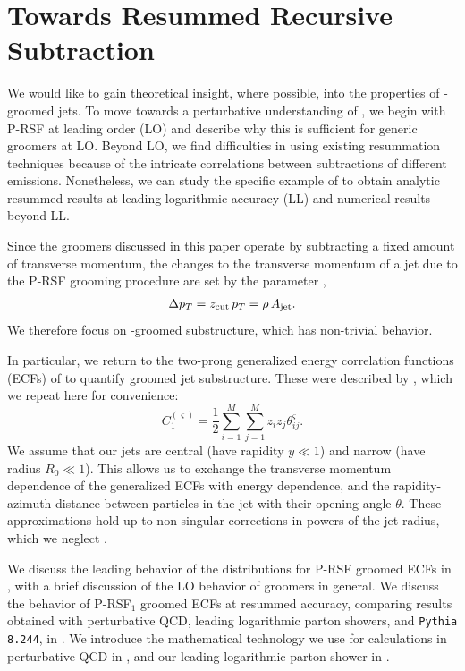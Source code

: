 \section{Towards Resummed Recursive Subtraction}
\label{app:calc}
We would like to gain theoretical insight, where possible, into the properties of \PIRANHA{}-groomed jets.
%
To move towards a perturbative understanding of \PIRANHA{}, we begin with P-RSF at leading order (LO) and describe why this is sufficient for generic \PIRANHA{} groomers at LO.
%
Beyond LO, we find difficulties in using existing resummation techniques because of the intricate correlations between subtractions of different emissions.
%
Nonetheless, we can study the specific example of  to obtain analytic resummed results at leading logarithmic accuracy (LL) and numerical results beyond LL.

Since the \PIRANHA{} groomers discussed in this paper operate by subtracting a fixed amount of transverse momentum, the changes to the transverse momentum of a jet due to the P-RSF grooming procedure are set by the parameter \zcut{},
\begin{align}
    \Delta p_T = z_{\rm cut}\,p_T = \rho\,A_{\rm jet}
    .
\end{align}
%
We therefore focus on \PIRANHA{}-groomed substructure, which has non-trivial behavior.

In particular, we return to the two-prong generalized energy correlation functions (ECFs) of  to quantify groomed jet substructure.
%
These were described by , which we repeat here for convenience:
\begin{equation}
    C_1^{(\varsigma)} = \frac{1}{2}\sum_{i=1}^M\sum_{j=1}^M z_i z_j \theta_{ij}^\varsigma
    \label{eqn:ECFdefn_repeat}
    .
\end{equation}
We assume that our jets are central (have rapidity \(y \ll 1\)) and narrow (have radius \(R_0 \ll 1\)).
%
This allows us to exchange the transverse momentum dependence of the generalized ECFs with energy dependence, and the rapidity-azimuth distance between particles in the jet with their opening angle \(\theta\).
%
These approximations hold up to non-singular corrections in powers of the jet radius, which we neglect \cite{Larkoski:2014wba}.

We discuss the leading behavior of the distributions for P-RSF groomed ECFs in , with a brief discussion of the LO behavior of \PIRANHA{} groomers in general.
%
We discuss the behavior of P-RSF\(_{1}\) groomed ECFs at resummed accuracy, comparing results obtained with perturbative QCD, leading logarithmic parton showers, and \texttt{Pythia 8.244}, in .
%
We introduce the mathematical technology we use for calculations in perturbative QCD in , and our leading logarithmic parton shower in .


